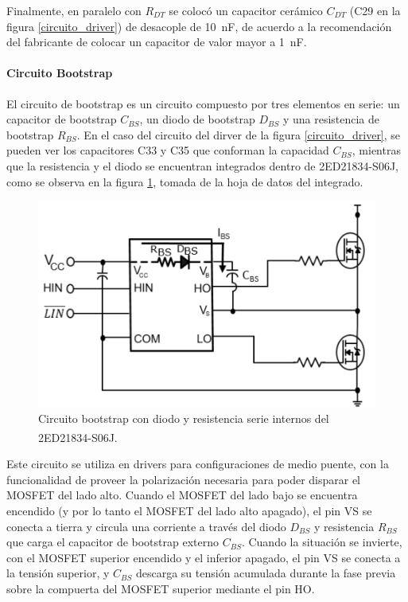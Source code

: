 Finalmente, en paralelo con $R_{DT}$ se colocó un capacitor cerámico $C_{DT}$ (C29 en la figura \ref{circuito_driver}) de desacople de \SI[]{10}{\nano\farad}, de acuerdo a la recomendación del fabricante de colocar un capacitor de valor mayor a \SI[]{1}{\nano\farad}.\\

\paragraph{Circuito Bootstrap}

El circuito de bootstrap es un circuito compuesto por tres elementos en serie: un capacitor de bootstrap $C_{BS}$, un diodo de bootstrap $D_{BS}$ y una resistencia de bootstrap $R_{BS}$. En el caso del circuito del dirver de la figura \ref{circuito_driver}, se pueden ver los capacitores C33 y C35 que conforman la capacidad $C_{BS}$, mientras que la resistencia y el diodo se encuentran integrados dentro de 2ED21834-S06J, como se observa en la figura \ref{circuito_bootstrap}, tomada de la hoja de datos del integrado.\\

\begin{figure}[h]
    \centering
    \includegraphics[scale=1]{Imagenes/Circuito Bootstrap.png}
    \caption{Circuito bootstrap con diodo y resistencia serie internos del 2ED21834-S06J.\textsuperscript{\cite{DatasheetDriver}}}
    \label{circuito_bootstrap}
\end{figure}

Este circuito se utiliza en drivers para configuraciones de medio puente, con la funcionalidad de proveer la polarización necesaria para poder disparar el MOSFET del lado alto. Cuando el MOSFET del lado bajo se encuentra encendido (y por lo tanto el MOSFET del lado alto apagado), el pin VS se conecta a tierra y circula una corriente a través del diodo $D_{BS}$ y resistencia $R_{BS}$ que carga el capacitor de bootstrap externo $C_{BS}$. Cuando la situación se invierte, con el MOSFET superior encendido y el inferior apagado, el pin VS se conecta a la tensión superior, y $C_{BS}$ descarga su tensión acumulada durante la fase previa sobre la compuerta del MOSFET superior mediante el pin HO.\\

